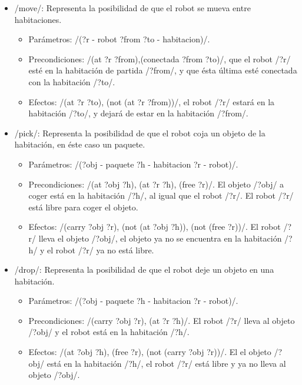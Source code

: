 \documentclass[	DIV=calc,%
							paper=a4,%
							fontsize=11pt]{scrartcl}	 					%
\begin{document}
	\begin{itemize}
		\item \newlispinline/move/: Representa la posibilidad de que el robot se mueva entre habitaciones.
		\begin{itemize}
			\item Parámetros: \newlispinline/(?r - robot ?from ?to - habitacion)/.
			\item Precondiciones: \newlispinline/(at ?r ?from),(conectada ?from ?to)/, que el robot \newlispinline/?r/ esté en la habitación de partida
			\newlispinline/?from/, y que ésta última esté conectada con la habitación \newlispinline/?to/.
			\item Efectos: \newlispinline/(at ?r ?to), (not (at ?r ?from))/, el robot \newlispinline/?r/ estará en la habitación \newlispinline/?to/, y dejará de estar en la habitación \newlispinline/?from/.
		\end{itemize}
		\item \newlispinline/pick/: Representa la posibilidad de que el robot coja un objeto de la habitación, en éste caso un paquete.
		\begin{itemize}
			\item Parámetros: \newlispinline/(?obj - paquete ?h - habitacion ?r - robot)/.
			\item Precondiciones: \newlispinline/(at ?obj ?h), (at ?r ?h), (free ?r)/. El objeto \newlispinline/?obj/ a coger está en la habitación
			 \newlispinline/?h/, al igual que el robot \newlispinline/?r/. El robot \newlispinline/?r/ está libre para coger el objeto.
			\item Efectos: \newlispinline/(carry ?obj ?r), (not (at ?obj ?h)), (not (free ?r))/. El robot \newlispinline/?r/ lleva el objeto \newlispinline/?obj/, el objeto ya no se encuentra en la habitación \newlispinline/?h/ y el robot \newlispinline/?r/ ya no está libre.
		\end{itemize}
		\item \newlispinline/drop/: Representa la posibilidad de que el robot deje un objeto en una habitación.
		\begin{itemize}
			\item Parámetros: \newlispinline/(?obj - paquete ?h - habitacion ?r - robot)/.
			\item Precondiciones: \newlispinline/(carry ?obj ?r), (at ?r ?h)/. El robot \newlispinline/?r/ lleva al objeto \newlispinline/?obj/ y el robot
			está en la habitación \newlispinline/?h/.
			\item Efectos: \newlispinline/(at ?obj ?h), (free ?r), (not (carry ?obj ?r))/. El el objeto \newlispinline/?obj/ está en la habitación \newlispinline/?h/, el robot \newlispinline/?r/ está libre y ya no lleva al objeto \newlispinline/?obj/.
		\end{itemize}
	\end{itemize}
\end{document}
